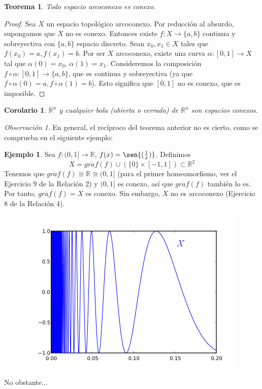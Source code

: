 \documentclass[12pt]{report}
\newtheorem{corollary}{Corolario}[chapter]
\newtheorem{theorem}{Teorema}[chapter]
\theoremstyle{definition}
\theoremstyle{definition}
\newtheorem{example}{Ejemplo}[chapter]
\theoremstyle{remark}
\newtheorem*{obs}{Observación} %
\newcommand{\R}{\mathbb R}
\begin{document}
\vspace{2mm}
\begin{theorem}
Todo espacio arcoconexo es conexo.
\end{theorem}
\begin{proof}
Sea $X$ un espacio topológico arcoconexo. Por reducción al absurdo, supongamos que $X$ no es conexo. Entonces existe $f \colon X \to \{a,b\}$ continua y sobreyectiva con $\{a,b\}$ espacio discreto. Sean $x_0, x_1 \in X$ tales que $f(x_0) = a, f(x_1) = b$. Por ser $X$ arcoconexo, existe una curva $\alpha \colon [0,1] \to X$ tal que $\alpha(0) = x_0$, $\alpha(1) = x_1$. Consideremos la composición $f \circ \alpha \colon [0,1] \to \{a,b\}$, que es continua y sobreyectiva (ya que $f \circ \alpha(0) = a, f \circ \alpha(1) = b$). Esto significa que $[0,1]$ no es conexo, que es imposible.
\end{proof}

\begin{corollary}
$\R^n$ y cualquier bola (abierta o cerrada) de $\R^n$ son espacios conexos.
\end{corollary}

\begin{obs}
En general, el recíproco del teorema anterior no es cierto, como se comprueba en el siguiente ejemplo:
\end{obs}

\begin{example}
Sea $f \colon (0,1] \to \R$, $f(x) = \sen{(\frac{1}{x})}$. Definimos 
\[X = gr\acute{a}f(f) \cup (\{0\} \times [-1,1]) \subset \R^2\]
Tenemos que $gr\acute{a}f(f) \cong \R \cong (0,1]$ (para el primer homeomorfismo, ver el Ejercicio 9 de la Relación 2) y $(0,1]$ es conexo, así que $gr\acute{a}f(f)$ también lo es. Por tanto, $\overline{gr\acute{a}f(f)} = X$ es conexo. Sin embargo, $X$ no es arcoconexo (Ejercicio 8 de la Relación 4).

\begin{figure}[h]
\includegraphics[scale = 0.8]{ex2.13}
\centering
\end{figure}

No obstante...
\end{example}
\end{document}
